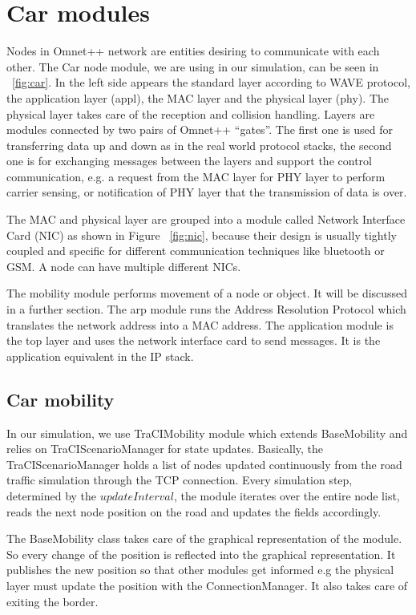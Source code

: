 \section{Car modules}
Nodes in Omnet++ network are entities desiring to communicate with each other.
The Car node module, we are using in our simulation, can be seen in
~\ref{fig:car}. In the left side appears the standard layer according to WAVE
protocol, the application layer (appl), the MAC layer and the physical
layer (phy). The physical layer takes care of the reception and collision
handling. Layers are modules connected by two pairs of Omnet++ ``gates''. The
first one is used for transferring data up and down as in the real world
protocol stacks, the second one is for exchanging messages between the layers
and support the control communication, e.g. a request from the MAC layer for PHY
layer to perform carrier sensing, or notification of PHY layer that the
transmission of data is over.

The MAC and physical layer are grouped into a module called Network Interface
Card (NIC) as shown in Figure ~\ref{fig:nic}, because their design is usually
tightly coupled and specific for different communication techniques like
bluetooth or GSM. A node can have multiple different NICs.

The mobility module performs movement of a node or object. It will be discussed
in a further section. The arp module runs the Address Resolution Protocol which
translates the network address into a MAC address. The application module is the
top layer and uses the network interface card to send messages. It is the
application equivalent in the IP stack.

\subsection{Car mobility}

In our simulation, we use TraCIMobility module which extends BaseMobility and
relies on TraCIScenarioManager for state updates. Basically, the
TraCIScenarioManager holds a list of nodes updated continuously from the road
traffic simulation through the TCP connection. Every simulation step, determined
by the $updateInterval$, the module iterates over the entire node list, reads
the next node position on the road and updates the fields accordingly.

The BaseMobility class takes care of the graphical representation of the module.
So every change of the position is reflected into the graphical representation.
It publishes the new position so that other modules get informed  e.g the
physical layer must update the position with the ConnectionManager. It also
takes care of exiting the border.

